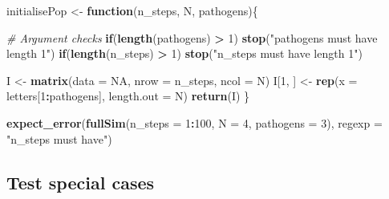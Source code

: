\documentclass[]{elsarticle} %
\newenvironment{Shaded}{\begin{snugshade}}{\end{snugshade}}
\newcommand{\CommentTok}[1]{\textcolor[rgb]{0.56,0.35,0.01}{\textit{#1}}}
\newcommand{\ControlFlowTok}[1]{\textcolor[rgb]{0.13,0.29,0.53}{\textbf{#1}}}
\newcommand{\DataTypeTok}[1]{\textcolor[rgb]{0.13,0.29,0.53}{#1}}
\newcommand{\DecValTok}[1]{\textcolor[rgb]{0.00,0.00,0.81}{#1}}
\newcommand{\KeywordTok}[1]{\textcolor[rgb]{0.13,0.29,0.53}{\textbf{#1}}}
\newcommand{\NormalTok}[1]{#1}
\newcommand{\OperatorTok}[1]{\textcolor[rgb]{0.81,0.36,0.00}{\textbf{#1}}}
\newcommand{\OtherTok}[1]{\textcolor[rgb]{0.56,0.35,0.01}{#1}}
\newcommand{\StringTok}[1]{\textcolor[rgb]{0.31,0.60,0.02}{#1}}
\begin{document}
\begin{Shaded}
\begin{Highlighting}[]
\NormalTok{initialisePop <-}\StringTok{ }\ControlFlowTok{function}\NormalTok{(n_steps, N, pathogens)\{}
  
  \CommentTok{# Argument checks}
  \ControlFlowTok{if}\NormalTok{(}\KeywordTok{length}\NormalTok{(pathogens) }\OperatorTok{>}\StringTok{ }\DecValTok{1}\NormalTok{) }\KeywordTok{stop}\NormalTok{(}\StringTok{"pathogens must have length 1"}\NormalTok{)}
  \ControlFlowTok{if}\NormalTok{(}\KeywordTok{length}\NormalTok{(n_steps) }\OperatorTok{>}\StringTok{ }\DecValTok{1}\NormalTok{) }\KeywordTok{stop}\NormalTok{(}\StringTok{"n_steps must have length 1"}\NormalTok{)}

\NormalTok{  I <-}\StringTok{ }\KeywordTok{matrix}\NormalTok{(}\DataTypeTok{data =} \OtherTok{NA}\NormalTok{, }\DataTypeTok{nrow =}\NormalTok{ n_steps, }\DataTypeTok{ncol =}\NormalTok{ N)}
\NormalTok{  I[}\DecValTok{1}\NormalTok{, ] <-}\StringTok{ }\KeywordTok{rep}\NormalTok{(}\DataTypeTok{x =}\NormalTok{ letters[}\DecValTok{1}\OperatorTok{:}\NormalTok{pathogens], }\DataTypeTok{length.out =}\NormalTok{ N)}
  \KeywordTok{return}\NormalTok{(I)}
\NormalTok{\}}

\KeywordTok{expect_error}\NormalTok{(}\KeywordTok{fullSim}\NormalTok{(}\DataTypeTok{n_steps =} \DecValTok{1}\OperatorTok{:}\DecValTok{100}\NormalTok{, }\DataTypeTok{N =} \DecValTok{4}\NormalTok{, }\DataTypeTok{pathogens =} \DecValTok{3}\NormalTok{), }
             \DataTypeTok{regexp =} \StringTok{"n_steps must have"}\NormalTok{)}
\end{Highlighting}
\end{Shaded}

\hypertarget{corners}{%
\subsection*{Test special cases}\label{corners}}
\end{document}
